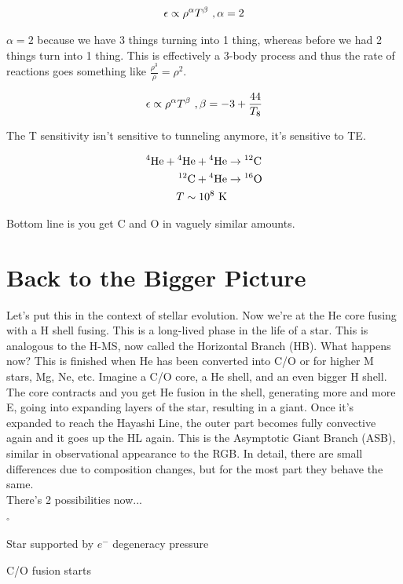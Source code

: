 \begin{align}
\epsilon \propto \rho^\alpha T^\beta~,\alpha =2
\end{align}

$\alpha=2$ because we have 3 things turning into 1 thing, whereas before we had 2 things turn into 1 thing. This is effectively a 3-body process and thus the rate of reactions goes something like $\frac{\rho^3}{\rho} = \rho^2$.

\begin{align}
\epsilon \propto \rho^\alpha T^\beta~,\beta = -3 +\frac{44}{T_8}
\end{align}

The T sensitivity isn't sensitive to tunneling anymore, it's sensitive to TE.

\begin{align}
\textrm{$^{4}$He} + \textrm{$^{4}$He} + \textrm{$^{4}$He} &\rightarrow \textrm{$^{12}$C}\\
\textrm{$^{12}$C}+ \textrm{$^{4}$He}& \rightarrow \textrm{$^{16}$O}\\
T\sim 10^8\textrm{ K}
\end{align}

Bottom line is you get C and O in vaguely similar amounts.

\section{Back to the Bigger Picture}
Let's put this in the context of stellar evolution. Now we're at the He core fusing with a H shell fusing. This is a long-lived phase in the life of a star. This is analogous to the H-MS, now called the Horizontal Branch (HB). What happens now? This is finished when He has been converted into C/O or for higher M stars, Mg, Ne, etc. Imagine a C/O core, a He shell, and an even bigger H shell. The core contracts and you get He fusion in the shell, generating more and more E, going into expanding layers of the star, resulting in a giant. Once it's expanded to reach the Hayashi Line, the outer part becomes fully convective again and it goes up the HL again. This is the Asymptotic Giant Branch (ASB), similar in observational appearance to the RGB. In detail, there are small differences due to composition changes, but for the most part they behave the same.\\

There's 2 possibilities now...
\begin{list}{$^\circ$}{}
\item Star supported by $e^-$ degeneracy pressure
\item C/O fusion starts
\end{list}

